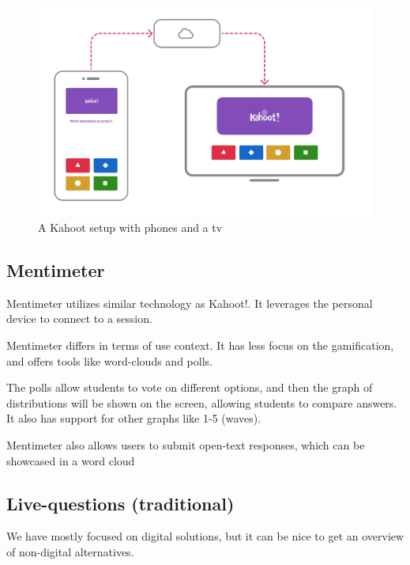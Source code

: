 
\begin{figure}[h!]
    \centering
    \includegraphics[width=1\linewidth]{figures/kahoot-illustration.png}
    \caption{A Kahoot setup with phones and a tv}
    \label{fig:kahoot}
\end{figure}

\subsection{Mentimeter}
Mentimeter utilizes similar technology as Kahoot!. It leverages the personal device to connect to a session. 

Mentimeter differs in terms of use context. It has less focus on the gamification, and offers tools like word-clouds and polls.

The polls allow students to vote on different options, and then the graph of distributions will be shown on the screen, allowing students to compare answers. It also has support for other graphs like 1-5 (waves).

Mentimeter also allows users to submit open-text responses, which can be showcased in a word cloud

\subsection{Live-questions (traditional)}

We have mostly focused on digital solutions, but it can be nice to get an overview of non-digital alternatives.

